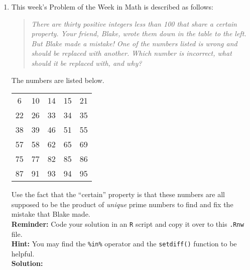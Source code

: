 \documentclass{article}\usepackage[]{graphicx}\usepackage[]{xcolor}
\begin{document}
\begin{enumerate}
\item This week's Problem of the Week in Math is described as follows:
\begin{quotation}
  \textit{There are thirty positive integers less than 100 that share a certain 
  property. Your friend, Blake, wrote them down in the table to the left. But 
  Blake made a mistake! One of the numbers listed is wrong and should be replaced 
  with another. Which number is incorrect, what should it be replaced with, and 
  why?}
\end{quotation}
The numbers are listed below.
\begin{center}
  \begin{tabular}{ccccc}
    6 & 10 & 14 & 15 & 21\\
    22 & 26 & 33 & 34 & 35\\
    38 & 39 & 46 & 51 & 55\\
    57 & 58 & 62 & 65 & 69\\
    75 & 77 & 82 & 85 & 86\\
    87 & 91 & 93 & 94 & 95
  \end{tabular}
\end{center}
Use the fact that the ``certain'' property is that these numbers are all supposed
to be the product of \emph{unique} prime numbers to find and fix the mistake that
Blake made.\\
\textbf{Reminder:} Code your solution in an \texttt{R} script and copy it over
to this \texttt{.Rnw} file.\\
\textbf{Hint:} You may find the \verb|%in%| operator and the \verb|setdiff()| function to be helpful.\\

\textbf{Solution:} 


\end{enumerate}
\end{document}
